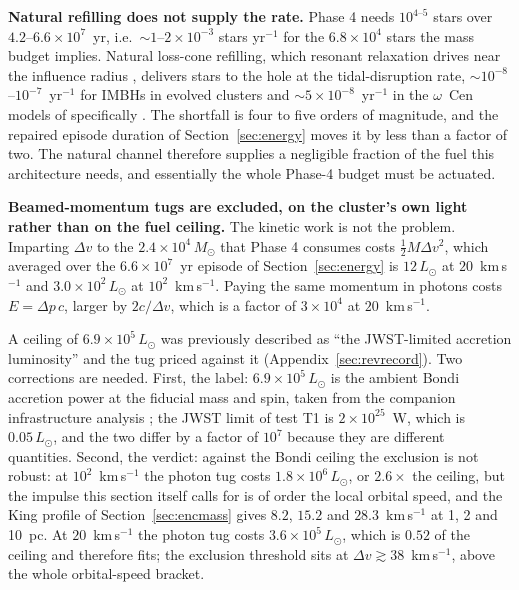 \documentclass[11pt]{article}
\newcommand{\msun}{\ensuremath{M_\odot}}
\begin{document}
\textbf{Natural refilling does not supply the rate.} Phase 4 needs $10^{4\text{--}5}$ stars over $4.2$--$6.6\times10^{7}$~yr, i.e.\ $\sim$$1$--$2\times10^{-3}$ stars yr$^{-1}$ for the $6.8\times10^{4}$ stars the mass budget implies. Natural loss-cone refilling, which resonant relaxation drives near the influence radius \citep{RauchTremaine1996}, delivers stars to the hole at the tidal-disruption rate, $\sim$$10^{-8}$--$10^{-7}$~yr$^{-1}$ for IMBHs in evolved clusters and $\sim$$5\times10^{-8}$~yr$^{-1}$ in the $\omega$~Cen models of \citet{GonzalezPrieto2025} specifically \citep{Swanson2026Engineered}. The shortfall is four to five orders of magnitude, and the repaired episode duration of Section~\ref{sec:energy} moves it by less than a factor of two. The natural channel therefore supplies a negligible fraction of the fuel this architecture needs, and essentially the whole Phase-4 budget must be actuated.

\textbf{Beamed-momentum tugs are excluded, on the cluster's own light rather than on the fuel ceiling.} The kinetic work is not the problem. Imparting $\Delta v$ to the $2.4\times10^{4}\,\msun$ that Phase 4 consumes costs $\tfrac{1}{2}M\Delta v^{2}$, which averaged over the $6.6\times10^{7}$~yr episode of Section~\ref{sec:energy} is $12\,L_\odot$ at $20$~km\,s$^{-1}$ and $3.0\times10^{2}\,L_\odot$ at $10^{2}$~km\,s$^{-1}$. Paying the same momentum in photons costs $E = \Delta p\,c$, larger by $2c/\Delta v$, which is a factor of $3\times10^{4}$ at $20$~km\,s$^{-1}$.

A ceiling of $6.9\times10^{5}\,L_\odot$ was previously described as ``the JWST-limited accretion luminosity'' and the tug priced against it (Appendix~\ref{sec:revrecord}). Two corrections are needed. First, the label: $6.9\times10^{5}\,L_\odot$ is the ambient Bondi accretion power at the fiducial mass and spin, taken from the companion infrastructure analysis \citep{Swanson2026Engineered}; the JWST limit of test T1 is $2\times10^{25}$~W, which is $0.05\,L_\odot$, and the two differ by a factor of $10^{7}$ because they are different quantities. Second, the verdict: against the Bondi ceiling the exclusion is not robust: at $10^{2}$~km\,s$^{-1}$ the photon tug costs $1.8\times10^{6}\,L_\odot$, or $2.6\times$ the ceiling, but the impulse this section itself calls for is of order the local orbital speed, and the King profile of Section~\ref{sec:encmass} gives $8.2$, $15.2$ and $28.3$~km\,s$^{-1}$ at 1, 2 and 10~pc. At $20$~km\,s$^{-1}$ the photon tug costs $3.6\times10^{5}\,L_\odot$, which is $0.52$ of the ceiling and therefore fits; the exclusion threshold sits at $\Delta v \gtrsim 38$~km\,s$^{-1}$, above the whole orbital-speed bracket.
\end{document}
